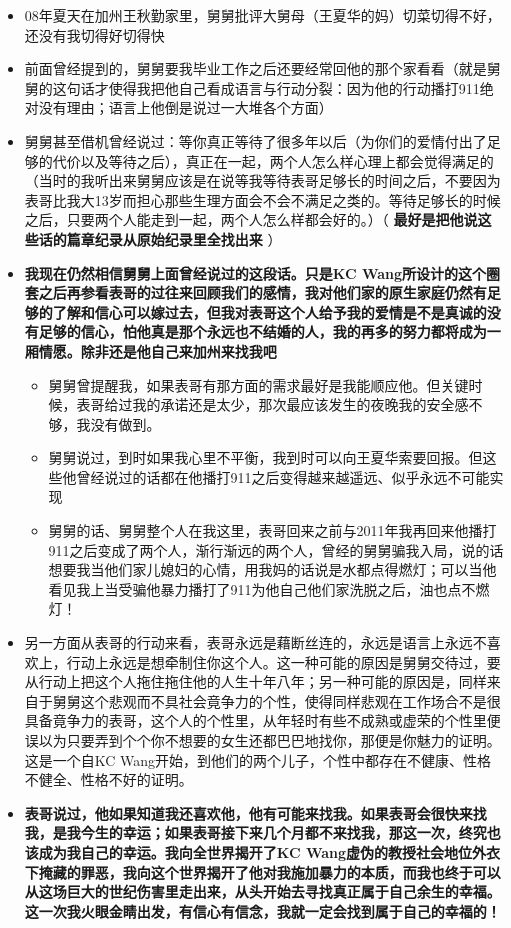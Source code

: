 \documentclass[9pt, b5paper]{article}
\begin{document}
\begin{enumerate}
\begin{itemize}
\begin{itemize}
\item 08年夏天在加州王秋勤家里，舅舅批评大舅母（王夏华的妈）切菜切得不好，还没有我切得好切得快

\item 前面曾经提到的，舅舅要我毕业工作之后还要经常回他的那个家看看（就是舅舅的这句话才使得我把他自己看成语言与行动分裂：因为他的行动播打911绝对没有理由；语言上他倒是说过一大堆各个方面）
\item 舅舅甚至借机曾经说过：等你真正等待了很多年以后（为你们的爱情付出了足够的代价以及等待之后），真正在一起，两个人怎么样心理上都会觉得满足的（当时的我听出来舅舅应该是在说等我等待表哥足够长的时间之后，不要因为表哥比我大13岁而担心那些生理方面会不会不满足之类的。等待足够长的时候之后，只要两个人能走到一起，两个人怎么样都会好的。）（ \textbf{最好是把他说这些话的篇章纪录从原始纪录里全找出来} ）
\item \textbf{我现在仍然相信舅舅上面曾经说过的这段话。只是KC Wang所设计的这个圈套之后再参看表哥的过往来回顾我们的感情，我对他们家的原生家庭仍然有足够的了解和信心可以嫁过去，但我对表哥这个人给予我的爱情是不是真诚的没有足够的信心，怕他真是那个永远也不结婚的人，我的再多的努力都将成为一厢情愿。除非还是他自己来加州来找我吧}
\begin{itemize}
\item 舅舅曾提醒我，如果表哥有那方面的需求最好是我能顺应他。但关键时候，表哥给过我的承诺还是太少，那次最应该发生的夜晚我的安全感不够，我没有做到。
\item 舅舅说过，到时如果我心里不平衡，我到时可以向王夏华索要回报。但这些他曾经说过的话都在他播打911之后变得越来越遥远、似乎永远不可能实现
\item 舅舅的话、舅舅整个人在我这里，表哥回来之前与2011年我再回来他播打911之后变成了两个人，渐行渐远的两个人，曾经的舅舅骗我入局，说的话想要我当他们家儿媳妇的心情，用我妈的话说是水都点得燃灯；可以当他看见我上当受骗他暴力播打了911为他自己他们家洗脱之后，油也点不燃灯！
\end{itemize}
\item 另一方面从表哥的行动来看，表哥永远是藉断丝连的，永远是语言上永远不喜欢上，行动上永远是想牵制住你这个人。这一种可能的原因是舅舅交待过，要从行动上把这个人拖住拖住他的人生十年八年；另一种可能的原因是，同样来自于舅舅这个悲观而不具社会竟争力的个性，使得同样悲观在工作场合不是很具备竟争力的表哥，这个人的个性里，从年轻时有些不成熟或虚荣的个性里便误以为只要弄到个个你不想要的女生还都巴巴地找你，那便是你魅力的证明。这是一个自KC Wang开始，到他们的两个儿子，个性中都存在不健康、性格不健全、性格不好的证明。
\item \textbf{表哥说过，他如果知道我还喜欢他，他有可能来找我。如果表哥会很快来找我，是我今生的幸运；如果表哥接下来几个月都不来找我，那这一次，终究也该成为我自己的幸运。我向全世界揭开了KC Wang虚伪的教授社会地位外衣下掩藏的罪恶，我向这个世界揭开了他对我施加暴力的本质，而我也终于可以从这场巨大的世纪伤害里走出来，从头开始去寻找真正属于自己余生的幸福。这一次我火眼金睛出发，有信心有信念，我就一定会找到属于自己的幸福的！}
\end{itemize}


\end{itemize}
\end{enumerate}
\end{document}
